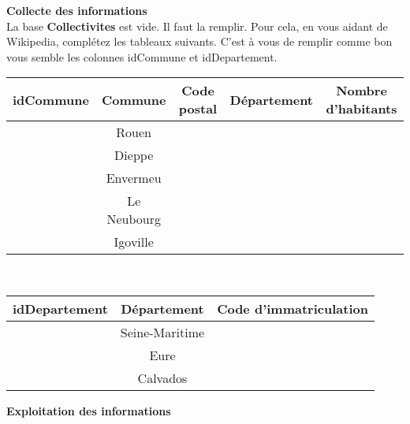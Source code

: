 \documentclass[a4paper,12pt,french]{book}
\begin{document}
\textbf{Collecte des informations}\\

La base \textbf{Collectivites} est vide. Il faut la remplir. Pour cela, en vous aidant de Wikipedia, complétez les tableaux suivants.
C'est à vous de remplir comme bon vous semble les colonnes idCommune et idDepartement.
\begin{center}
\begin{tabular}{|c|c|c|c|c|}
	\hline
	\rowcolor{UGLiOrange}\color{white} idCommune &\color{white}	\textbf{Commune} & \color{white}\textbf{Code postal} & \color{white}\textbf{Département} &\color{white} \textbf{Nombre d'habitants} \\
	\hline\color{black}
	&Rouen &  &  &  \\
	\hline
	&Dieppe &  &  &  \\
	\hline
	&Envermeu &  &  &  \\
	\hline
	&Le Neubourg &  &  &  \\
	\hline
	&Igoville &  &  &  \\
	\hline
\end{tabular}\\[1em]

\begin{tabular}{|c|c|c|}
	\hline
\rowcolor{UGLiOrange}\color{white} idDepartement &\color{white}	\textbf{Département} & \color{white}\textbf{Code d'immatriculation} \\
	\hline
	&Seine-Maritime  & \\
	\hline
	&Eure&  \\
\hline
	&Calvados&  \\
\hline

\end{tabular}
\end{center}

\textbf{Exploitation des informations}\\
\end{document}
